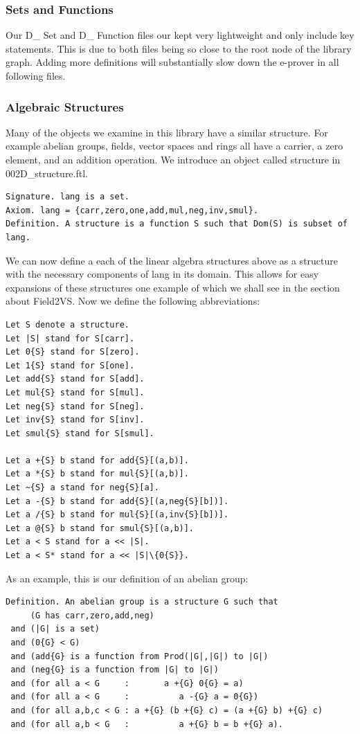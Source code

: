 \documentclass[11pt]{article}
\begin{document}
\subsubsection{Sets and Functions}

Our D\_ Set and D\_ Function files our kept very lightweight and only include key statements. This is due to both files being so close to the root node of the library graph. Adding more definitions will substantially slow down the e-prover in all following files.

\subsubsection{Algebraic Structures}
Many of the objects we examine in this library have a similar structure. For example abelian groups, fields, vector spaces and rings all have a carrier, a zero element, and an addition operation. We introduce an object called structure in 002D\_structure.ftl.

\begin{lstlisting}
Signature. lang is a set.
Axiom. lang = {carr,zero,one,add,mul,neg,inv,smul}.
Definition. A structure is a function S such that Dom(S) is subset of lang.
\end{lstlisting}

We can now define a each of the linear algebra structures above as a structure with the necessary components of {\ftl lang} in its domain. This allows for easy expansions of these structures one example of which we shall see in the section about Field2VS. Now we define the following abbreviations:

\begin{lstlisting}
Let S denote a structure.
Let |S| stand for S[carr].
Let 0{S} stand for S[zero].
Let 1{S} stand for S[one].
Let add{S} stand for S[add].
Let mul{S} stand for S[mul].
Let neg{S} stand for S[neg].
Let inv{S} stand for S[inv].
Let smul{S} stand for S[smul].

Let a +{S} b stand for add{S}[(a,b)].
Let a *{S} b stand for mul{S}[(a,b)].
Let ~{S} a stand for neg{S}[a].
Let a -{S} b stand for add{S}[(a,neg{S}[b])].
Let a /{S} b stand for mul{S}[(a,inv{S}[b])].
Let a @{S} b stand for smul{S}[(a,b)].
Let a < S stand for a << |S|.
Let a < S* stand for a << |S|\{0{S}}.
\end{lstlisting}

\newpage
As an example, this is our definition of an abelian group:
\begin{lstlisting}
Definition. An abelian group is a structure G such that
     (G has carr,zero,add,neg)
 and (|G| is a set)
 and (0{G} < G)
 and (add{G} is a function from Prod(|G|,|G|) to |G|)
 and (neg{G} is a function from |G| to |G|)
 and (for all a < G     :       a +{G} 0{G} = a)
 and (for all a < G     :          a -{G} a = 0{G})
 and (for all a,b,c < G : a +{G} (b +{G} c) = (a +{G} b) +{G} c)
 and (for all a,b < G   :          a +{G} b = b +{G} a). 
\end{lstlisting}
\end{document}
